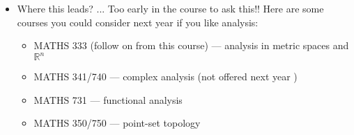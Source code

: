 \documentclass[a4paper,twoside]{article}
\begin{document}
\begin{itemize}
\begin{itemize}
  \end{itemize}
  \item Where this leads? ...  Too early in the course to ask this!! Here are some courses you could consider next year if you like analysis:
  \begin{itemize}
    \item MATHS 333 (follow on from this course) --- analysis in metric spaces and $ \mathbb{R}^n $
    \item MATHS 341/740 --- complex analysis (not offered next year \frownie{} )
    \item MATHS 731 --- functional analysis
    \item MATHS 350/750 --- point-set topology
  \end{itemize}
  \end{itemize}
\end{document}
